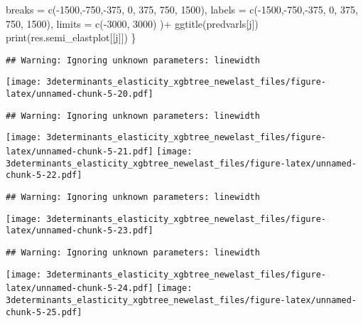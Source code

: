 \documentclass[
]{article}
\newenvironment{Shaded}{\begin{snugshade}}{\end{snugshade}}
\newcommand{\AttributeTok}[1]{\textcolor[rgb]{0.77,0.63,0.00}{#1}}
\newcommand{\DecValTok}[1]{\textcolor[rgb]{0.00,0.00,0.81}{#1}}
\newcommand{\FunctionTok}[1]{\textcolor[rgb]{0.00,0.00,0.00}{#1}}
\newcommand{\NormalTok}[1]{#1}
\newcommand{\SpecialCharTok}[1]{\textcolor[rgb]{0.00,0.00,0.00}{#1}}
\begin{document}
\begin{Shaded}
\begin{Highlighting}[]
                                         \AttributeTok{breaks =} \FunctionTok{c}\NormalTok{(}\SpecialCharTok{{-}}\DecValTok{1500}\NormalTok{,}\SpecialCharTok{{-}}\DecValTok{750}\NormalTok{,}\SpecialCharTok{{-}}\DecValTok{375}\NormalTok{, }\DecValTok{0}\NormalTok{, }\DecValTok{375}\NormalTok{, }\DecValTok{750}\NormalTok{, }\DecValTok{1500}\NormalTok{),}
                                         \AttributeTok{labels =} \FunctionTok{c}\NormalTok{(}\SpecialCharTok{{-}}\DecValTok{1500}\NormalTok{,}\SpecialCharTok{{-}}\DecValTok{750}\NormalTok{,}\SpecialCharTok{{-}}\DecValTok{375}\NormalTok{, }\DecValTok{0}\NormalTok{, }\DecValTok{375}\NormalTok{, }\DecValTok{750}\NormalTok{, }\DecValTok{1500}\NormalTok{),}
                                         \AttributeTok{limits =} \FunctionTok{c}\NormalTok{(}\SpecialCharTok{{-}}\DecValTok{3000}\NormalTok{, }\DecValTok{3000}\NormalTok{)}
\NormalTok{                                       )}\SpecialCharTok{+} \FunctionTok{ggtitle}\NormalTok{(predvarls[j])}
  \FunctionTok{print}\NormalTok{(res.semi\_elastplot[[j]])}
\NormalTok{\}}
\end{Highlighting}
\end{Shaded}

\begin{verbatim}
## Warning: Ignoring unknown parameters: linewidth
\end{verbatim}

\texttt{[image: 3determinants\_elasticity\_xgbtree\_newelast\_files/figure-latex/unnamed-chunk-5-20.pdf]}

\begin{verbatim}
## Warning: Ignoring unknown parameters: linewidth
\end{verbatim}

\texttt{[image: 3determinants\_elasticity\_xgbtree\_newelast\_files/figure-latex/unnamed-chunk-5-21.pdf]}
\texttt{[image: 3determinants\_elasticity\_xgbtree\_newelast\_files/figure-latex/unnamed-chunk-5-22.pdf]}

\begin{verbatim}
## Warning: Ignoring unknown parameters: linewidth
\end{verbatim}

\texttt{[image: 3determinants\_elasticity\_xgbtree\_newelast\_files/figure-latex/unnamed-chunk-5-23.pdf]}

\begin{verbatim}
## Warning: Ignoring unknown parameters: linewidth
\end{verbatim}

\texttt{[image: 3determinants\_elasticity\_xgbtree\_newelast\_files/figure-latex/unnamed-chunk-5-24.pdf]}
\texttt{[image: 3determinants\_elasticity\_xgbtree\_newelast\_files/figure-latex/unnamed-chunk-5-25.pdf]}
\end{document}
